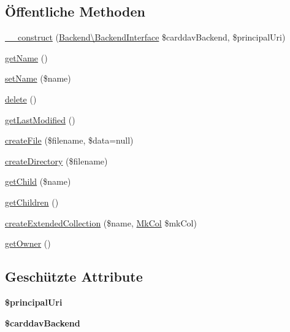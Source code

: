 \subsection*{Öffentliche Methoden}
\begin{DoxyCompactItemize}
\item 
\mbox{\hyperlink{class_sabre_1_1_card_d_a_v_1_1_address_book_home_ae7959dbbbd1acc202ab6996a8ab46f19}{\+\_\+\+\_\+construct}} (\mbox{\hyperlink{interface_sabre_1_1_card_d_a_v_1_1_backend_1_1_backend_interface}{Backend\textbackslash{}\+Backend\+Interface}} \$carddav\+Backend, \$principal\+Uri)
\item 
\mbox{\hyperlink{class_sabre_1_1_card_d_a_v_1_1_address_book_home_a4cfbe732cded342ce80e74fd4b4c321a}{get\+Name}} ()
\item 
\mbox{\hyperlink{class_sabre_1_1_card_d_a_v_1_1_address_book_home_a5f10222c82a11fdc8af8b8588b6b957b}{set\+Name}} (\$name)
\item 
\mbox{\hyperlink{class_sabre_1_1_card_d_a_v_1_1_address_book_home_a29657335a312f6563e8b6c676d69d350}{delete}} ()
\item 
\mbox{\hyperlink{class_sabre_1_1_card_d_a_v_1_1_address_book_home_a155aa79f745345d56d8ca4f9571cbf93}{get\+Last\+Modified}} ()
\item 
\mbox{\hyperlink{class_sabre_1_1_card_d_a_v_1_1_address_book_home_a134a28efb6add7eec8f9e79c21763ea3}{create\+File}} (\$filename, \$data=null)
\item 
\mbox{\hyperlink{class_sabre_1_1_card_d_a_v_1_1_address_book_home_aa96416a748fd5423662ad389f75ed5ef}{create\+Directory}} (\$filename)
\item 
\mbox{\hyperlink{class_sabre_1_1_card_d_a_v_1_1_address_book_home_ae7b3aaf05451966e44a11ce81f97ea28}{get\+Child}} (\$name)
\item 
\mbox{\hyperlink{class_sabre_1_1_card_d_a_v_1_1_address_book_home_a6df725f024e566d1d94f5fc312c2c17d}{get\+Children}} ()
\item 
\mbox{\hyperlink{class_sabre_1_1_card_d_a_v_1_1_address_book_home_ad3be16bc98c19b0e44565c2738787258}{create\+Extended\+Collection}} (\$name, \mbox{\hyperlink{class_sabre_1_1_d_a_v_1_1_mk_col}{Mk\+Col}} \$mk\+Col)
\item 
\mbox{\hyperlink{class_sabre_1_1_card_d_a_v_1_1_address_book_home_afc2b53f38407b25302906080cf04d176}{get\+Owner}} ()
\end{DoxyCompactItemize}
\subsection*{Geschützte Attribute}
\begin{DoxyCompactItemize}
\item 
\mbox{\label{class_sabre_1_1_card_d_a_v_1_1_address_book_home_a1a399c8ad2f266cea5d8f51a30474f83}} 
{\bfseries \$principal\+Uri}
\item 
\mbox{\label{class_sabre_1_1_card_d_a_v_1_1_address_book_home_aede5b68bd99f099846d95ea8397d3943}} 
{\bfseries \$carddav\+Backend}
\end{DoxyCompactItemize}


